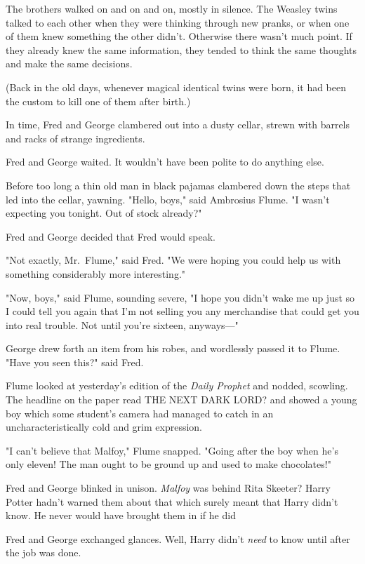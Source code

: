 The brothers walked on and on and on, mostly in silence. The Weasley twins
talked to each other when they were thinking through new pranks, or when one of
them knew something the other didn't. Otherwise there wasn't much point. If
they already knew the same information, they tended to think the same thoughts
and make the same decisions.

(Back in the old days, whenever magical identical twins were born, it had been
the custom to kill one of them after birth.)

In time, Fred and George clambered out into a dusty cellar, strewn with barrels
and racks of strange ingredients.

Fred and George waited. It wouldn't have been polite to do anything else.

Before too long a thin old man in black pajamas clambered down the steps that
led into the cellar, yawning. "Hello, boys," said Ambrosius Flume. "I wasn't
expecting you tonight. Out of stock already?"

Fred and George decided that Fred would speak.

"Not exactly, Mr.~Flume," said Fred. "We were hoping you could help us with
something considerably more{\el} interesting."

"Now, boys," said Flume, sounding severe, "I hope you didn't wake me up just so
I could tell you again that I'm not selling you any merchandise that could get
you into real trouble. Not until you're sixteen, anyways\mbox{---}"

George drew forth an item from his robes, and wordlessly passed it to Flume.
"Have you seen this?" said Fred.

Flume looked at yesterday's edition of the \emph{Daily Prophet} and nodded,
scowling. The headline on the paper read THE NEXT DARK LORD? and showed a young
boy which some student's camera had managed to catch in an uncharacteristically
cold and grim expression.

"I can't believe that Malfoy," Flume snapped. "Going after the boy when he's
only eleven! The man ought to be ground up and used to make chocolates!"

Fred and George blinked in unison. \emph{Malfoy} was behind Rita Skeeter? Harry
Potter hadn't warned them about that{\el} which surely meant that Harry
didn't know. He never would have brought them in if he did{\el}

Fred and George exchanged glances. Well, Harry didn't \emph{need} to know until
after the job was done.

